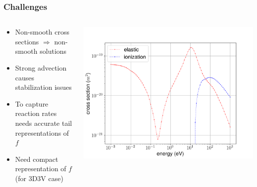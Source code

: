 \documentclass[mathserif, aspectratio=169]{beamer}
\begin{document}
\begin{frame}
	\frametitle{Challenges}
	\begin{columns}
		\begin{column}{0.3\textwidth}
			\begin{itemize}
				\item Non-smooth cross sections $\Rightarrow$ non-smooth solutions
				\item Strong advection causes stabilization issues
				\item To capture reaction rates needs accurate tail representations of $f$
				\item Need compact representation of $f$ (for 3D3V case)
			\end{itemize}
		\end{column}
		\begin{column}{0.7\textwidth}
			\vspace*{-0.8in}
			\begin{center}
				\includegraphics[width=\columnwidth]{g0_g2_cs.png}
			\end{center}
		\end{column}
	\end{columns}
\end{frame}
\end{document}
